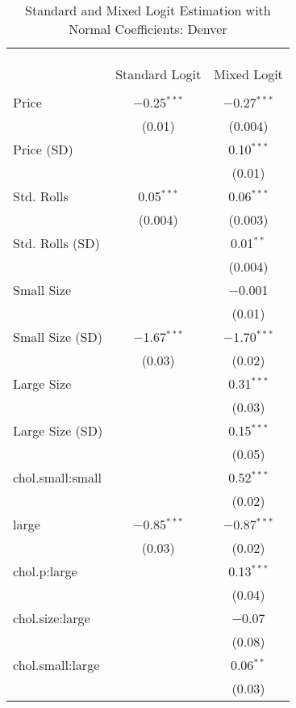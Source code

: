 
\begin{table}[!htbp] \centering 
  \caption{Standard and Mixed Logit Estimation with Normal Coefficients: Denver} 
  \label{tab:mnlDenverBaseline} 
\begin{tabular}{@{\extracolsep{5pt}}lcc} 
\\[-1.8ex]\hline 
\hline \\[-1.8ex] 
\\[-1.8ex] & \multicolumn{2}{c}{} \\ 
 & Standard Logit & Mixed Logit \\ 
\hline \\[-1.8ex] 
 Price & $-$0.25$^{***}$ & $-$0.27$^{***}$ \\ 
  & (0.01) & (0.004) \\ 
  Price (SD) &  & 0.10$^{***}$ \\ 
  &  & (0.01) \\ 
  Std. Rolls & 0.05$^{***}$ & 0.06$^{***}$ \\ 
  & (0.004) & (0.003) \\ 
  Std. Rolls (SD) &  & 0.01$^{**}$ \\ 
  &  & (0.004) \\ 
  Small Size &  & $-$0.001 \\ 
  &  & (0.01) \\ 
  Small Size (SD) & $-$1.67$^{***}$ & $-$1.70$^{***}$ \\ 
  & (0.03) & (0.02) \\ 
  Large Size &  & 0.31$^{***}$ \\ 
  &  & (0.03) \\ 
  Large Size (SD) &  & 0.15$^{***}$ \\ 
  &  & (0.05) \\ 
  chol.small:small &  & 0.52$^{***}$ \\ 
  &  & (0.02) \\ 
  large & $-$0.85$^{***}$ & $-$0.87$^{***}$ \\ 
  & (0.03) & (0.02) \\ 
  chol.p:large &  & 0.13$^{***}$ \\ 
  &  & (0.04) \\ 
  chol.size:large &  & $-$0.07 \\ 
  &  & (0.08) \\ 
  chol.small:large &  & 0.06$^{**}$ \\ 
  &  & (0.03) \\ 

\end{tabular}
\end{table}

